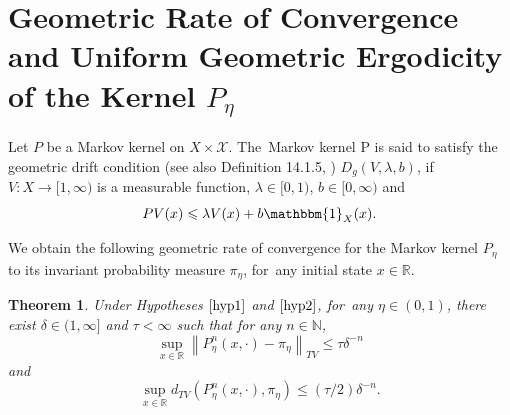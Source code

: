 \documentclass[11pt]{elsarticle}
\newtheorem{theorem}{Theorem}[section]
\def\leq{\leqslant}
\def\N{\mathbb{N}}
\def\R{\mathbb{R}}
\begin{document}
\section{{Geometric Rate of Convergence and Uniform Geometric Ergodicity of the Kernel $P_{ \eta}$}}\label{sec3}
Let $P$ be a Markov kernel on $X\times\mathcal{X}$. The~Markov kernel P is said to satisfy the geometric drift condition (see also {Definition 14.1.5}, \cite{DMPS18}) $D_{g}(V,\lambda, b)$, if~$V: X \rightarrow [1, \infty)$ is a measurable function, $\lambda\in[0,1)$, $b\in[0,\infty)$ and
\begin{equation}\label{drift}
	PV(x)\leq\lambda V(x)+b\mathbbm{1}_X(x).
\end{equation}

We obtain the following geometric rate of convergence for the Markov kernel $P_{\eta}$ to its invariant probability measure $\pi_\eta$, for~any initial state $x\in\R$.
\begin{theorem}\label{Thm2}
	Under Hypotheses $\ref{hyp1}$ and $\ref{hyp2}$, for~any $\eta\in (0,1)$, there exist $\delta\in(1,\infty]$ and $\tau<\infty$ such that for any $n\in\N$,
	\begin{equation}\label{Def_uniformlyGE}
		\sup_{x\in \R}\left\|P_{\eta}^n(x,\cdot)-\pi_{\eta}\right\|_{TV}\leq\tau\delta^{-n}
	\end{equation}
	and
	\begin{equation}\label{uniformlyGE}
		\sup_{x\in \R}d_{TV}\left(P_{\eta}^n(x,\cdot),\pi_{\eta}\right)\leq\left(\tau/2\right)\delta^{-n}.
	\end{equation}
\end{theorem}
\end{document}
